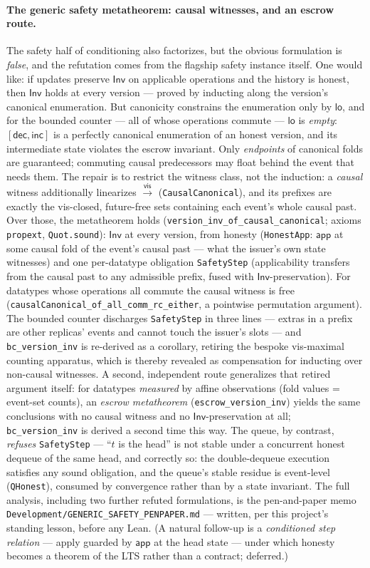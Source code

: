 \documentclass[11pt]{article}
\newcommand{\vis}{\xrightarrow{\mathsf{vis}}}
\newcommand{\lean}[1]{\texttt{#1}}
\newcommand{\Inv}{\mathsf{Inv}}
\newcommand{\app}{\mathsf{app}}
\begin{document}
\paragraph{The generic safety metatheorem: causal witnesses, and an
escrow route.} The safety half of conditioning also factorizes, but the
obvious formulation is \emph{false}, and the refutation comes from the
flagship safety instance itself. One would like: if updates preserve
$\Inv$ on applicable operations and the history is honest, then $\Inv$
holds at every version --- proved by inducting along the version's
canonical enumeration. But canonicity constrains the enumeration only by
$\mathsf{lo}$, and for the bounded counter --- all of whose operations
commute --- $\mathsf{lo}$ is \emph{empty}: $[\mathsf{dec}, \mathsf{inc}]$
is a perfectly canonical enumeration of an honest version, and its
intermediate state violates the escrow invariant. Only \emph{endpoints}
of canonical folds are guaranteed; commuting causal predecessors may
float behind the event that needs them. The repair is to restrict the
witness class, not the induction: a \emph{causal} witness additionally
linearizes $\vis$ (\lean{CausalCanonical}), and its prefixes are exactly
the vis-closed, future-free sets containing each event's whole causal
past. Over those, the metatheorem holds
(\lean{version\_inv\_of\_causal\_canonical}; axioms \lean{propext},
\lean{Quot.sound}): $\Inv$ at every version, from honesty
(\lean{HonestApp}: $\app$ at some causal fold of the event's causal past
--- what the issuer's own state witnesses) and one per-datatype
obligation \lean{SafetyStep} (applicability transfers from the causal
past to any admissible prefix, fused with $\Inv$-preservation). For
datatypes whose operations all commute the causal witness is free
(\lean{causalCanonical\_of\_all\_comm\_rc\_either}, a pointwise
permutation argument). The bounded counter discharges \lean{SafetyStep}
in three lines --- extras in a prefix are other replicas' events and
cannot touch the issuer's slots --- and \lean{bc\_version\_inv} is
re-derived as a corollary, retiring the bespoke vis-maximal counting
apparatus, which is thereby revealed as compensation for inducting over
non-causal witnesses. A second, independent route generalizes that
retired argument itself: for datatypes \emph{measured} by affine
observations (fold values = event-set counts), an \emph{escrow
metatheorem} (\lean{escrow\_version\_inv}) yields the same conclusions
with no causal witness and no $\Inv$-preservation at all;
\lean{bc\_version\_inv} is derived a second time this way. The queue,
by contrast, \emph{refuses} \lean{SafetyStep} --- ``$t$ is the head'' is
not stable under a concurrent honest dequeue of the same head, and
correctly so: the double-dequeue execution satisfies any sound
obligation, and the queue's stable residue is event-level
(\lean{QHonest}), consumed by convergence rather than by a state
invariant. The full analysis, including two further refuted
formulations, is the pen-and-paper memo
\lean{Development/GENERIC\_SAFETY\_PENPAPER.md} --- written, per this
project's standing lesson, before any Lean. (A natural follow-up is a
\emph{conditioned step relation} --- apply guarded by $\app$ at the head
state --- under which honesty becomes a theorem of the LTS rather than a
contract; deferred.)
\end{document}
